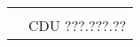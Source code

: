 \begin{fichacatalografica}
\begin{center}
\begin{tabular}{|cp{13cm}|}
		& \\ 
		& \hspace{9.75cm} CDU ???.???.?? \\
		\hline
	\end{tabular}
	\end{center}
\end{fichacatalografica}
